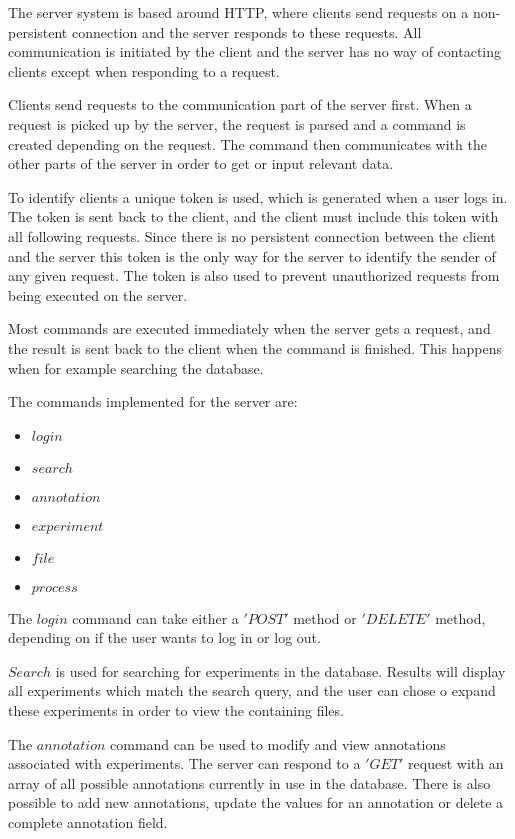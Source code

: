 The server system is based around HTTP, where clients send requests on a non-persistent connection and the server responds to these requests. All communication is initiated by the client and the server has no way of contacting clients except when responding to a request. 

Clients send requests to the communication part of the server first. When a request is picked up by the server, the request is parsed and a command is created depending on the request. The command then communicates with the other parts of the server in order to get or input relevant data. 

To identify clients a unique token is used, which is generated when a user logs in. The token is sent back to the client, and the client must include this token with all following requests. Since there is no persistent connection between the client and the server this token is the only way for the server to identify the sender of any given request. The token is also used to prevent unauthorized requests from being executed on the server.

Most commands are executed immediately when the server gets a request, and the result is sent back to the client when the command is finished. This happens when for example searching the database. 

The commands implemented for the server are:

\begin{itemize}
	\item $login$
	\item $search$
	\item $annotation$
	\item $experiment$
	\item $file$
	\item $process$
\end{itemize}

The $login$ command can take either a $'POST'$ method or $'DELETE'$ method, depending on if the user wants to log in or log out. 

$Search$ is used for searching for experiments in the database. Results will display all experiments which match the search query, and the user can chose o expand these experiments in order to view the containing files. 

The $annotation$ command can be used to modify and view annotations associated with experiments. The server can respond to a $'GET'$ request with an array of all possible annotations currently in use in the database. There is also possible to add new annotations, update the values for an annotation or delete a complete annotation field. 


